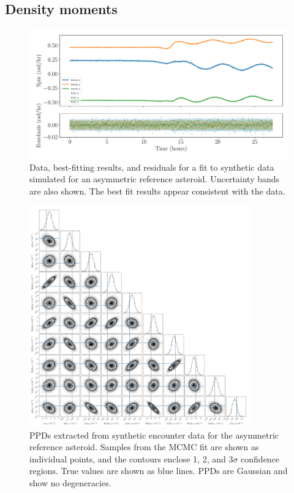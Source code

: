 \documentclass[fleqn,usenatbib]{mnras}
\begin{document}
\subsection{Density moments}
\label{sec:example-fit}
\begin{figure}
  \centering
  \includegraphics[width=\linewidth]{figs/example-residuals.pdf}
  \caption{Data, best-fitting results, and residuals for a fit to synthetic data simulated for an asymmetric reference asteroid. Uncertainty bands are also shown. The best fit results appear consistent with the data.}
  \label{fig:example-residuals}
\end{figure}

\begin{figure}
  \centering
  \includegraphics[width=0.85\textwidth]{figs/example-corner.png}
  \caption{PPDs extracted from synthetic encounter data for the asymmetric reference asteroid. Samples from the MCMC fit are shown as individual points, and the contours enclose 1, 2, and 3$\sigma$ confidence regions. True values are shown as blue lines. PPDs are Gaussian and show no degeneracies.}
  \label{fig:example-corner}
\end{figure}
\end{document}
